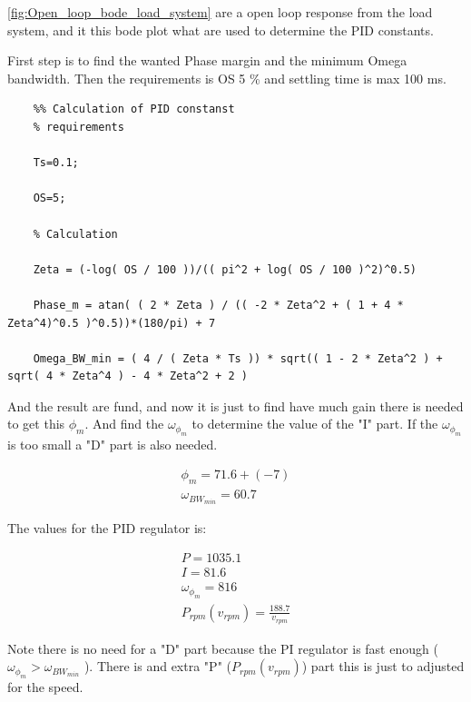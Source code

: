 \ref{fig:Open_loop_bode_load_system} are a open loop response from the load system, and it this bode plot what are used to determine the PID constants.

First step is to find the wanted Phase margin and the minimum Omega bandwidth. Then the requirements is OS 5 \% and settling time is max 100 ms.

\newpage

\begin{lstlisting}
	%% Calculation of PID constanst
	% requirements
	
	Ts=0.1;
	
	OS=5; 
	
	% Calculation
	
	Zeta = (-log( OS / 100 ))/(( pi^2 + log( OS / 100 )^2)^0.5)
	
	Phase_m = atan( ( 2 * Zeta ) / (( -2 * Zeta^2 + ( 1 + 4 * Zeta^4)^0.5 )^0.5))*(180/pi) + 7
	
	Omega_BW_min = ( 4 / ( Zeta * Ts )) * sqrt(( 1 - 2 * Zeta^2 ) + sqrt( 4 * Zeta^4 ) - 4 * Zeta^2 + 2 ) 
\end{lstlisting} 

And the result are fund, and now it is just to find have much gain there is needed to get this $ \phi_{m} $. And find the $ \omega _{\phi _{m}} $ to determine the value of the "I" part. If the $ \omega _{\phi _{m}} $ is too small a "D" part is also needed. 

\begin{equation}
	\begin{split}
		\phi_{m}= 71.6 + ( -7 )\\
		\omega_{{BW}_{{min}}}= 60.7
	\end{split}
\end{equation}

The values for the PID regulator is: 

\begin{equation}
	\begin{split}
		P = 1035.1\\
		I = 81.6\\
		\omega _{\phi _{m}}=816\\
		P_{{rpm}} \left( v_{{rpm}} \right) = \frac{188.7}{v_{{rpm}}}
	\end{split}
\end{equation}

Note there is no need for a "D" part because the PI regulator is fast enough ($ \omega _{\phi _{m}} > \omega_{{BW}_{{min}}} $ ). There is and extra "P" ($ P_{{rpm}} \left( v_{{rpm}} \right) $) part this is just to adjusted for the speed.


